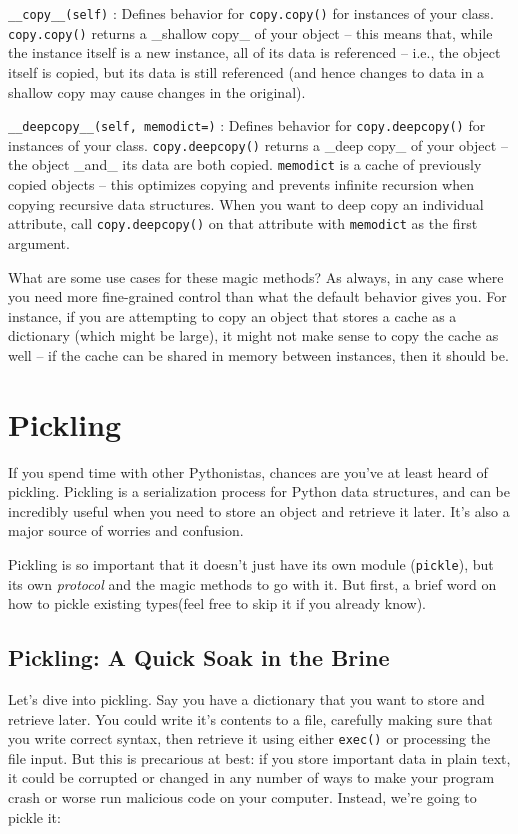 \documentclass[a4paper,11pt]{article}
\newcommand{\code}[1]{\texttt{#1}}
\begin{document}
\code{__copy__(self)}
:   Defines behavior for \code{copy.copy()} for instances of your class. \code{copy.copy()} returns a _shallow copy_ of your object -- this means that, while the instance itself is a new instance, all of its data is referenced -- i.e., the object itself is copied, but its data is still referenced (and hence changes to data in a shallow copy may cause changes in the original).

\code{__deepcopy__(self, memodict={})}
:    Defines behavior for \code{copy.deepcopy()} for instances of your class. \code{copy.deepcopy()} returns a _deep copy_ of your object -- the object _and_ its data are both copied. \code{memodict} is a cache of previously copied objects -- this optimizes copying and prevents infinite recursion when copying recursive data structures. When you want to deep copy an individual attribute, call \code{copy.deepcopy()} on that attribute with \code{memodict} as the first argument.

What are some use cases for these magic methods? As always, in any case where you need more fine-grained control than what the default behavior gives you. For instance, if you are attempting to copy an object that stores a cache as a dictionary (which might be large), it might not make sense to copy the cache as well -- if the cache can be shared in memory between instances, then it should be.

\section{Pickling}

If you spend time with other Pythonistas, chances are you've at least heard of pickling. Pickling is a serialization process for Python data structures, and can be incredibly useful when you need to store an object and retrieve it later. It's also a major source of worries and confusion.

Pickling is so important that it doesn't just have its own module (\code{pickle}), but its own \emph{protocol} and the magic methods to go with it. But first, a brief word on how to pickle existing types(feel free to skip it if you already know).

\subsection{Pickling: A Quick Soak in the Brine}

Let's dive into pickling. Say you have a dictionary that you want to store and retrieve later. You could write it's contents to a file, carefully making sure that you write correct syntax, then retrieve it using either \code{exec()} or processing the file input. But this is precarious at best: if you store important data in plain text, it could be corrupted or changed in any number of ways to make your program crash or worse run malicious code on your computer. Instead, we're going to pickle it:
\end{document}
